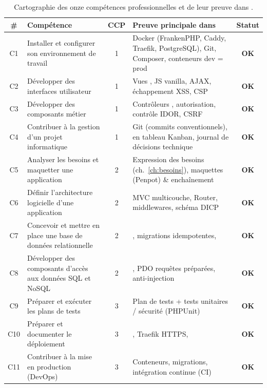 \begin{table}[ht]
\centering
\renewcommand{\arraystretch}{1.35}
\small
\begin{tabularx}{\textwidth}{@{}c L{4.3cm} c X c@{}}
\toprule
\textbf{\#} & \textbf{Compétence} & \textbf{CCP} & \textbf{Preuve principale dans \projet{}} & \textbf{Statut} \\
\midrule
C1 & Installer et configurer son environnement de travail & 1 & Docker (FrankenPHP, Caddy, Traefik, PostgreSQL), Git, Composer, conteneurs dev = prod & \textcolor{juryGreen}{\textbf{OK}} \\
C2 & Développer des interfaces utilisateur & 1 & Vues , JS vanilla, AJAX, échappement XSS, CSP & \textcolor{juryGreen}{\textbf{OK}} \\
C3 & Développer des composants métier & 1 & Contrôleurs , autorisation, contrôle IDOR, CSRF & \textcolor{juryGreen}{\textbf{OK}} \\
C4 & Contribuer à la gestion d'un projet informatique & 1 & Git (commits conventionnels),  en tableau Kanban, journal de décisions technique & \textcolor{juryGreen}{\textbf{OK}} \\
C5 & Analyser les besoins et maquetter une application & 2 & Expression des besoins (ch.~\ref{ch:besoins}), maquettes (Penpot) \& enchaînement & \textcolor{juryGreen}{\textbf{OK}} \\
C6 & Définir l'architecture logicielle d'une application & 2 & MVC multicouche, Router, middlewares, schéma DICP & \textcolor{juryGreen}{\textbf{OK}} \\
C7 & Concevoir et mettre en place une base de données relationnelle & 2 & , migrations idempotentes,  & \textcolor{juryGreen}{\textbf{OK}} \\
C8 & Développer des composants d'accès aux données SQL et NoSQL & 2 & , PDO requêtes préparées, anti-injection & \textcolor{juryGreen}{\textbf{OK}} \\
C9 & Préparer et exécuter les plans de tests & 3 & Plan de tests + tests unitaires / sécurité (PHPUnit) & \textcolor{juryGreen}{\textbf{OK}} \\
C10 & Préparer et documenter le déploiement & 3 & , Traefik HTTPS,  & \textcolor{juryGreen}{\textbf{OK}} \\
C11 & Contribuer à la mise en production (DevOps) & 3 & Conteneurs, migrations, intégration continue (CI) & \textcolor{juryGreen}{\textbf{OK}} \\
\bottomrule
\end{tabularx}
\caption{Cartographie des onze compétences professionnelles et de leur preuve dans \projet{}.}
\label{tab:competences}
\end{table}

